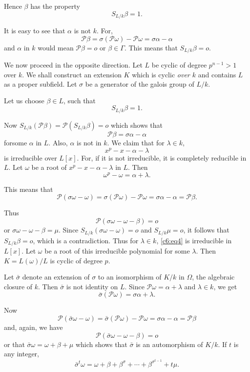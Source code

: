 Hence $\beta$ has the property
$$
S_{L/k} \beta =1.
$$

It is easy to see that $\alpha$ is not $k$. For, 
$$
\mathscr{P} \beta = \sigma (\mathscr{P} \omega) - \mathscr{P} \omega=
\sigma \alpha - \alpha 
$$
and $\alpha$ in $k$ would mean $\mathscr{P} \beta = o$ or $\beta \in
\Gamma$. This means that $S_{L/k}\beta = o$. 

We now proceed in the opposite direction. Let $L$ be cyclic of degree
$p^{n-1} > 1$ over $k$. We shall construct an extension $K$ which is
cyclic \textit{over $k$} and contains $L$ as a proper subfield. Let
$\sigma$ be a generator of the galois group of $L/k$. 

Let us choose $\beta \in L$, such that
$$
S_{L/k} \beta = 1.
$$

Now $ S_{L/k}(\mathscr{P} \beta) = \mathscr{P}(S_{L/k} \beta) = o $
which shows that 
$$
\mathscr{P} \beta = \sigma \alpha - \alpha
$$
for\pageoriginale some $\alpha$ in $L$. Also, $\alpha$ is not in
$k$. We claim that for $\lambda \in k$,   
\begin{equation}
x^p - x - \alpha - \lambda \tag{4}\label{c6:eq4}
\end{equation}
is irreducible over $L [x]$. For, if it is not irreducible, it is
completely reducible in $L$. Let $\omega$ be a root of $x^p - x-
\alpha-\lambda$ in $L$. Then 
$$
\omega^p - \omega = \alpha + \lambda.
$$

This means that
$$
\mathscr{P} (\sigma \omega - \omega) = \sigma (\mathscr{P} \omega) -
\mathscr{P} \omega=\sigma \alpha - \alpha = \mathscr{P} \beta. 
$$
 
Thus
$$
\mathscr{P} (\sigma \omega - \omega - \beta) = o 
$$
or $\sigma \omega - \omega - \beta = \mu $. Since $S_{L/k}(\sigma 
\omega-\omega)=o$ and $S_{L/k}\mu =o$, it follows that
$S_{L/k}\beta=o$, which is a contradiction. Thus for $\lambda \in
k$, \eqref{c6:eq4} is irreducible in $L [x]$. Let $\omega$ be a root of this
irreducible polynomial for some $\lambda$. Then $K=L(\omega)/L$ is
cyclic of degree $p$. 

Let $\bar{\sigma}$ denote an extension of $\sigma$ to an isomorphism
of $K/k$ in $\Omega$, the algebraic closure of $k$. Then
$\bar{\sigma}$ is not identity on $L$. Since $\mathscr{P}
\omega = \alpha + \lambda$ and $\lambda \in k$, we get 
$$
\bar{\sigma}(\mathscr{P} \omega) = \sigma \alpha + \lambda.
$$
 
Now
$$
\mathscr{P}(\bar{\sigma}\omega - \omega)= \bar {\sigma}
(\mathscr{P}\omega) - \mathscr{P} \omega = \sigma \alpha - \alpha =
\mathscr{P} \beta 
$$
and, again, we have
$$
\mathscr{P}(\bar{\sigma} \omega - \omega - \beta) =o 
$$
or that $\bar{\sigma} \omega  = \omega +\beta + \mu$ which shows that
$\bar{\sigma}$ is an automorphism of $K/k$. If $t$ is any integer, 
$$
\bar{\sigma}^t \omega = \omega + \beta + \beta^\sigma + \cdots +
\beta^{\sigma^{t-1}} + t \mu. 
$$\pageoriginale

